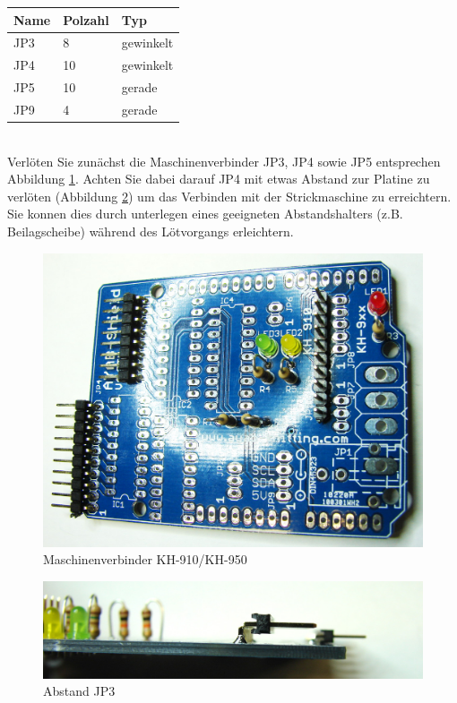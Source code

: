 \documentclass[fleqn,10pt]{SelfArx} %
\begin{document}
\begin{tabular}{lll}
\hline
\textbf{Name} & \textbf{Polzahl}  & \textbf{Typ} \\ \hline
JP3           & 8                 & gewinkelt    \\ \hline
JP4           & 10                & gewinkelt    \\ \hline
JP5           & 10                & gerade       \\ \hline
JP9           & 4                 & gerade       \\ \hline
\end{tabular}\\

Verlöten Sie zunächst die Maschinenverbinder JP3, JP4 sowie JP5 entsprechen Abbildung \ref{fig:abb3_1}. Achten Sie dabei darauf JP4 mit etwas Abstand zur Platine zu verlöten (Abbildung \ref{fig:abb3_2}) um das Verbinden mit der Strickmaschine zu erreichtern. Sie konnen dies durch unterlegen eines geeigneten Abstandshalters (z.B. Beilagscheibe) während des Lötvorgangs erleichtern.

\begin{figure}[tbhp]\centering
\includegraphics[width=\linewidth]{abb3_1}
\caption{Maschinenverbinder KH-910/KH-950}
\label{fig:abb3_1}
\end{figure}

\begin{figure}[tbhp]\centering
\includegraphics[width=\linewidth]{abb3_2}
\caption{Abstand JP3}
\label{fig:abb3_2}
\end{figure}
\end{document}
